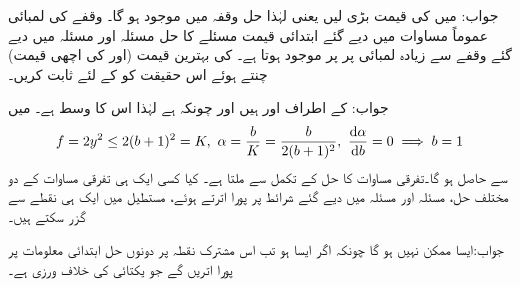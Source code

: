 جواب: میں  کی قیمت بڑی لیں یعنی  لہٰذا حل وقفہ  میں موجود ہو گا۔
\quad {} وقفے کی لمبائی\\
عموماً مساوات  میں دیے گئے ابتدائی قیمت مسئلے کا حل مسئلہ  اور مسئلہ  میں دیے گئے وقفے سے زیادہ لمبائی پر  پر موجود ہوتا ہے۔ کی بہترین قیمت (اور  کی اچھی قیمت) چنتے ہوئے اس حقیقت کو  کے لئے ثابت کریں۔

جواب: کے اطراف  اور  ہیں اور چونکہ  ہے لہٰذا اس  کا وسط  ہے۔ میں
\begin{align*}
f=2y^2\le 2(b+1)^2=K,\,\,\alpha =\frac{b}{K}=\frac{b}{2(b+1)^2},\,\, \frac{\dif \alpha}{\dif b}=0 \implies b=1
\end{align*}
سے  حاصل ہو گا۔تفرقی مساوات کا حل  کے تکمل  سے  ملتا ہے۔
کیا کسی ایک ہی تفرقی مساوات کے دو مختلف حل، مسئلہ  اور مسئلہ  میں دیے گئے شرائط پر پورا اترتے ہوئے، مستطیل میں ایک ہی نقطے سے گزر سکتے ہیں۔

جواب:ایسا ممکن نہیں ہو گا چونکہ اگر ایسا ہو تب اس مشترک نقطہ  پر دونوں حل ابتدائی معلومات  پر پورا اتریں گے جو یکتائی کی خلاف ورزی ہے۔
